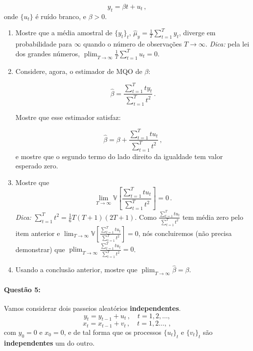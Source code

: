 \documentclass[10pt,a4paper]{article}
\begin{document}
		$$y_t = \beta t + u_t \, ,$$
		onde $\{u_t\}$ é ruído branco, e $\beta > 0$.
		
		\begin{enumerate}
			\item Mostre que a média amostral de $\{y_t\}_t$, $\hat{\mu}_y = \frac{1}{T}\sum_{t=1}^T y_t$, diverge em probabilidade para $\infty$ quando o número de observações $T \to \infty$. \textit{Dica:} pela lei dos grandes números, $\operatorname{plim}_{T \to \infty}\frac{1}{T}\sum_{t=1}^T u_t  = 0$.
			\item Considere, agora, o estimador de MQO de $\beta$:
			
			$$\hat{\beta} = \frac{\sum_{t=1}^T t y_t}{\sum_{t=1}^T t^2}\, .$$
			
			Mostre que esse estimador satisfaz:
			
			$$\hat{\beta} = \beta +  \frac{\sum_{t=1}^T t u_t }{\sum_{t=1}^T t^2} \, ,$$
			e mostre que o segundo termo do lado direito da igualdade tem valor esperado zero.
			\item Mostre que 
			$$\lim_{T \to \infty}\mathbb{V}\left[ \frac{\sum_{t=1}^T t u_t }{\sum_{t=1}^T t^2}\right] = 0\, .$$
			\textit{Dica:} $\sum_{t=1}^T t^2 =\frac{1}{6} T(T+1)(2T+1)$. Como $\frac{\sum_{t=1}^T t u_t }{\sum_{t=1}^T t^2}$ tem média zero pelo item anterior e $\lim_{T \to \infty}\mathbb{V}\left[ \frac{\sum_{t=1}^T t u_t }{\sum_{t=1}^T t^2}\right] = 0$, nós concluiremos (não precisa demonstrar) que $\operatorname{plim}_{T\to \infty} \frac{\sum_{t=1}^T t u_t }{\sum_{t=1}^T t^2} = 0$. 
			
			\item Usando a conclusão anterior, mostre que $\operatorname{plim}_{T\to \infty} \hat{\beta} = \beta$.
			
		\end{enumerate} 
		
			\paragraph{Questão 5:} Vamos considerar dois passeios aleatórios \textbf{independentes}.
			$$y_t = y_{t-1} + u_t \, ,\quad  t=1,2,\ldots, $$
						$$x_t = x_{t-1} + v_t \, ,\quad  t=1,2\ldots, \, , $$
			com $y_0 = 0$ e $x_0 = 0$, e de tal forma que os processos $\{u_t\}_t$ e $\{v_t\}_t$ são \textbf{independentes} um do outro.
			
\end{document}
